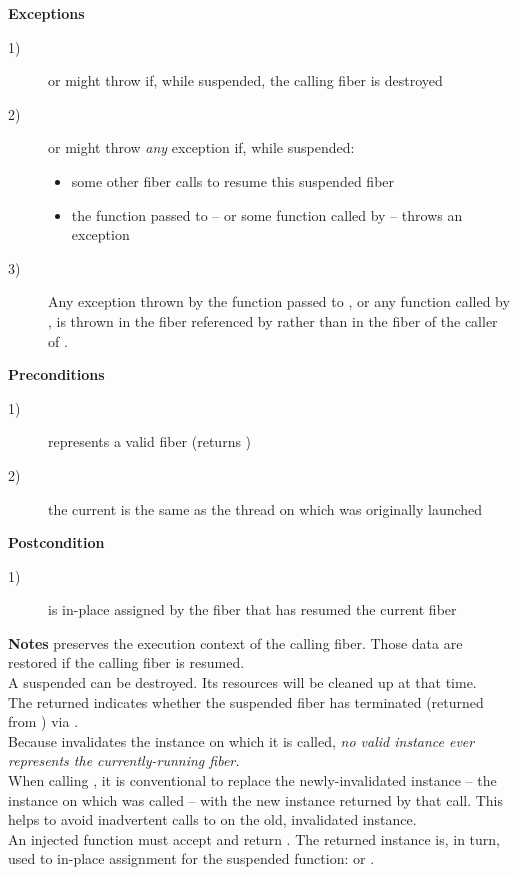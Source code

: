 {\bfseries Exceptions}
\begin{description}
    \item[1)] \resume or \resumewith might throw \unwindex if, while suspended,
              the calling fiber is destroyed
    \item[2)] \resume or \resumewith might throw \emph{any} exception if,
              while suspended:
              \begin{itemize}
                  \item some other fiber calls \resumewith to resume this
                        suspended fiber
                  \item the function  passed to \resumewith -- or some
                        function called by  -- throws an exception
              \end{itemize}
    \item[3)] Any exception thrown by the function  passed to
              \resumewith, or any function called by , is thrown in the
              fiber referenced by  rather than in the fiber of
              the caller of \resumewith.
\end{description}

{\bfseries Preconditions}
\begin{description}
    \item[1)]  represents a valid fiber (\opbool returns )
    \item[2)] the current  is the same as the thread on which
               was originally launched
\end{description}

{\bfseries Postcondition}
\begin{description}
    \item[1)]  is in-place assigned by the fiber that has resumed
            the current fiber
\end{description}

{\bfseries Notes}
\newline
\resume preserves the execution context of the calling fiber. Those data are
restored if the calling fiber is resumed.\\
A suspended  can be destroyed. Its resources will be cleaned
up at that time.\\
The returned  indicates whether the suspended fiber has
terminated (returned from \entryfn) via \opbool.\\
Because \resume invalidates the instance on which it is called, \emph{no valid
\fiber instance ever represents the currently-running fiber.}\\
When calling \resume, it is conventional to replace the newly-invalidated
instance -- the instance on which \resume was called -- with the new instance
returned by that \resume call. This helps to avoid inadvertent calls to \resume
on the old, invalidated instance.\\
An injected function  must accept  and
return \fiber. The returned \fiber instance is, in turn, used to in-place
assignment for the suspended function: \resume or \resumewith.



